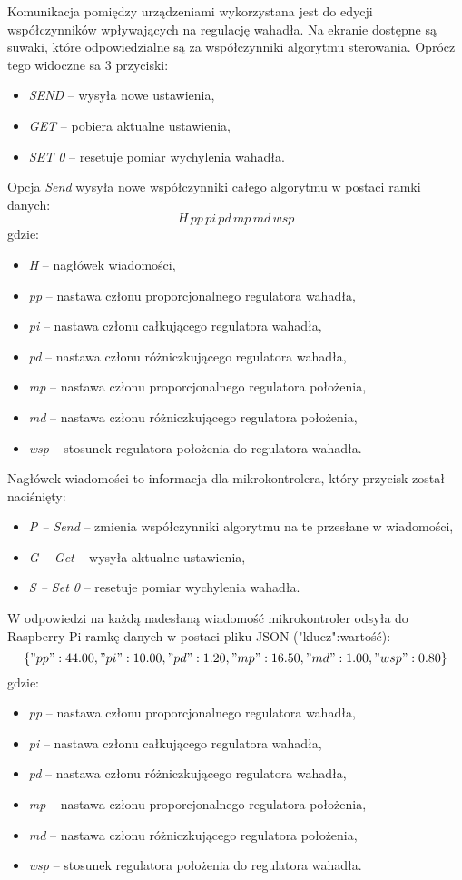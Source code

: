 Komunikacja pomiędzy urządzeniami wykorzystana jest do edycji współczynników wpływających na regulację wahadła. Na ekranie dostępne są suwaki, które odpowiedzialne są za współczynniki algorytmu sterowania. Oprócz tego widoczne sa 3 przyciski:
\begin{itemize}
    \item \textit{SEND} -- wysyła nowe ustawienia,
    \item \textit{GET} -- pobiera aktualne ustawienia,
    \item \textit{SET 0} -- resetuje pomiar wychylenia wahadła.
\end{itemize}
Opcja \textit{Send} wysyła nowe współczynniki całego algorytmu w postaci ramki danych: \[H\,pp\,pi\,pd\,mp\,md\,wsp\]
gdzie:
\begin{itemize}
    \item \textit{H} -- nagłówek wiadomości,
    \item \textit{pp} -- nastawa członu proporcjonalnego regulatora wahadła, 
    \item \textit{pi} -- nastawa członu całkującego regulatora wahadła,
    \item \textit{pd} -- nastawa członu różniczkującego regulatora wahadła,
    \item \textit{mp} -- nastawa członu proporcjonalnego regulatora położenia,
    \item \textit{md} -- nastawa członu różniczkującego regulatora położenia,
    \item \textit{wsp} -- stosunek regulatora położenia do regulatora wahadła.
    \label{it:ramka}
\end{itemize}
Nagłówek wiadomości to informacja dla mikrokontrolera, który przycisk został naciśnięty:
\begin{itemize}
    \item \textit{P -- Send} -- zmienia współczynniki algorytmu na te przesłane w wiadomości,
    \item \textit{G -- Get} --  wysyła aktualne ustawienia,
    \item \textit{S -- Set 0} -- resetuje pomiar wychylenia wahadła.
\end{itemize}
W odpowiedzi na każdą nadesłaną wiadomość mikrokontroler odsyła do Raspberry Pi ramkę danych w postaci pliku JSON ("klucz":wartość):
\[\{"pp":44.00,"pi":10.00,"pd":1.20,"mp":16.50,"md":1.00,"wsp":0.80\}\] 
gdzie:
\begin{itemize}
    \item \textit{pp} -- nastawa członu proporcjonalnego regulatora wahadła, 
    \item \textit{pi} -- nastawa członu całkującego regulatora wahadła,
    \item \textit{pd} -- nastawa członu różniczkującego regulatora wahadła,
    \item \textit{mp} -- nastawa członu proporcjonalnego regulatora położenia,
    \item \textit{md} -- nastawa członu różniczkującego regulatora położenia,
    \item \textit{wsp} -- stosunek regulatora położenia do regulatora wahadła.
    \label{it:ramka}
\end{itemize}

